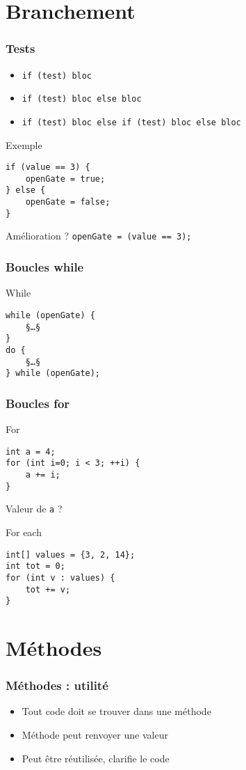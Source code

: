 \documentclass[english, french]{beamer}
\begin{document}
\section{Branchement}
\begin{frame}[fragile]
	\frametitle{Tests}
	\begin{itemize}
		\item \texttt{if (test) bloc}
		\item \texttt{if (test) bloc else bloc}
		\item \texttt{if (test) bloc else if (test) bloc else bloc}
	\end{itemize}
	\begin{block}{Exemple}
		\begin{lstlisting}
if (value == 3) {
	openGate = true;
} else {
	openGate = false;
}
		\end{lstlisting}	
	\end{block}
	Amélioration ? \pause \texttt{openGate = (value == 3);}
\end{frame}

\begin{frame}[fragile]
	\frametitle{Boucles while}
	\begin{block}{While}
		\begin{lstlisting}
while (openGate) {
	§…§
}
do {
	§…§
} while (openGate);
		\end{lstlisting}	
	\end{block}
\end{frame}

\begin{frame}[fragile]
	\frametitle{Boucles for}
	\begin{block}{For}
		\begin{lstlisting}
int a = 4;
for (int i=0; i < 3; ++i) {
	a += i;
}
		\end{lstlisting}	
	\end{block}
	Valeur de \texttt{a} ? \onslide<2->{\texttt{7}}
	\begin{block}{For each}
		\begin{lstlisting}
int[] values = {3, 2, 14};
int tot = 0;
for (int v : values) {
	tot += v;
}
		\end{lstlisting}	
	\end{block}
\end{frame}

\section{Méthodes}
\begin{frame}[fragile]
	\frametitle{Méthodes : utilité}
	\begin{itemize}
		\item Tout code doit se trouver dans une méthode
		\item Méthode peut renvoyer une valeur
		\item Peut être réutilisée, clarifie le code
	\end{itemize}
\end{frame}
\end{document}
